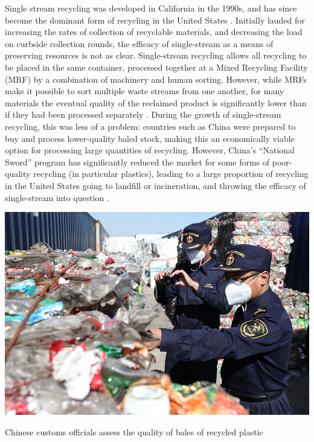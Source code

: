 \documentclass[nofonts,nols,justified,nobib]{tufte-book}
\begin{document}
Single stream recycling was developed in California in the 1990s, and has since become the dominant form of recycling in the United States \cite{laskow_single-stream_2014}. Initially lauded for increasing the rates of collection of recyclable materials, and decreasing the load on curbside collection rounds, the efficacy of single-stream as a means of preserving resources is not as clear. Single-stream recycling allows all recycling to be placed in the same container, processed together at a Mixed Recycling Facility (MRF) by a combination of machinery and human sorting. However, while MRFs make it possible to sort multiple waste streams from one another, for many materials the eventual quality of the reclaimed product is significantly lower than if they had been processed separately \cite{morawski_understanding_2009}. During the growth of single-stream recycling, this was less of a problem: countries such as China were prepared to buy and process lower-quality baled stock, making this an economically viable option for processing large quantities of recycling. However, China's ``National Sword'' program has significantly reduced the market for some forms of poor-quality recycling (in particular plastics), leading to a large proportion of recycling in the United States going to landfill or incineration, and throwing the efficacy of single-stream into question \cite{milman_moment_2019, albeck-ripka_your_2018, martin_reverberations_2017}.

\begin{marginfigure}
\includegraphics[width=\textwidth]{img/1/china-recycling-inspection.jpg}
\caption{Chinese customs officials assess the quality of bales of recycled plastic \cite{martin_reverberations_2017}}
\end{marginfigure}
\end{document}
